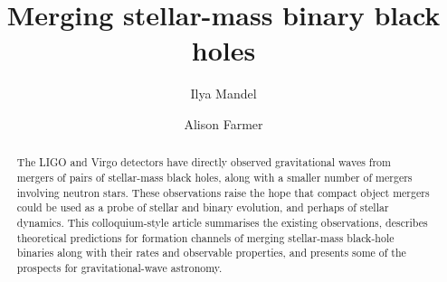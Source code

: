 \documentclass[review]{elsarticle}
\begin{document}

\begin{frontmatter}



\title{Merging stellar-mass binary black holes}


\author[1,2,3]{Ilya Mandel}
{}
\author[4]{Alison Farmer}

\begin{abstract}
The LIGO and Virgo detectors have directly observed gravitational waves from mergers of pairs of stellar-mass black holes, along with a smaller number of mergers involving neutron stars.  These observations raise the hope that compact object mergers could be used as a probe of stellar and binary evolution, and perhaps of stellar dynamics. This colloquium-style article summarises the existing observations, describes theoretical predictions for formation channels of merging stellar-mass black-hole binaries along with their rates and observable properties, and presents some of the prospects for gravitational-wave astronomy.
\end{abstract}



\end{frontmatter}

\linenumbers
\end{document}
